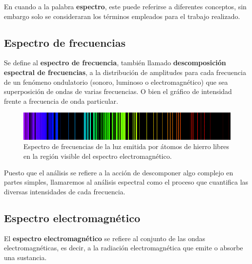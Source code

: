 \documentclass[letterpaper,titlepage,12pt,draft]{report}
\begin{document}
En cuando a la palabra {\bf espectro}, este puede referirse a diferentes conceptos, sin embargo solo se consideraran los t\'erminos empleados para el trabajo realizado.

\subsection{Espectro de frecuencias}

Se define al {\bf espectro de frecuencia}, tambi\'en llamado {\bf descomposici\'on espectral de frecuencias}, a la distribuci\'on de amplitudes para cada frecuencia de un fen\'omeno ondulatorio (sonoro, luminoso o electromagn\'etico) que sea superposici\'on de ondas de varias frecuencias. O bien el gr\'afico de intensidad frente a frecuencia de onda particular. \\

\begin{figure}[H]
\begin{center}
\includegraphics[scale=0.5]{ef.png}
\caption{Espectro de frecuencias de la luz emitida por \'atomos de hierro libres en la regi\'on visible del espectro electromagn\'etico.}
\label{fig:ef}
\end{center}
\end{figure}

Puesto que el an\'alisis se refiere a la acci\'on de descomponer algo complejo en partes simples, llamaremos al an\'alisis espectral como el proceso que cuantifica las diversas intensidades de cada frecuencia. 

\subsection{Espectro electromagn\'etico}

El {\bf espectro electromagn\'etico} se refiere al conjunto de las ondas electromagn\'eticas, es decir, a la radiaci\'on electromagn\'etica que emite o absorbe una sustancia.
\end{document}
